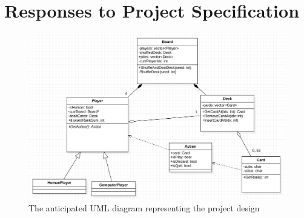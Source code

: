 \documentclass[10pt]{article}
\begin{document}
	\section{Responses to Project Specification}
		\begin{figure}[H]
			\includegraphics[width=\textwidth]{../uml.png}
			\caption{The anticipated UML diagram representing the project design}
		\end{figure}
\end{document}
